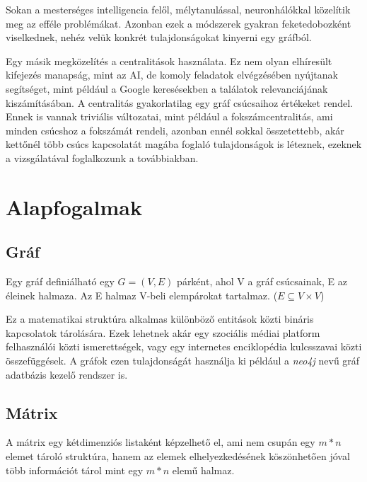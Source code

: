 \documentclass[12pt,numbers=noenddot]{report}
\begin{document}
Sokan a mesterséges intelligencia felől, mélytanulással, neuronhálókkal 
közelítik meg az efféle problémákat. Azonban ezek a módszerek gyakran 
feketedobozként viselkednek, nehéz velük konkrét tulajdonságokat kinyerni egy 
gráfból.

Egy másik megközelítés a centralitások használata. Ez nem olyan elhíresült 
kifejezés manapság, mint az AI, de komoly feladatok elvégzésében nyújtanak 
segítséget, mint például a Google keresésekben a találatok relevanciájának 
kiszámításában.
A centralitás gyakorlatilag egy gráf csúcsaihoz értékeket rendel. Ennek is 
vannak triviális változatai, mint például a fokszámcentralitás, ami minden 
csúcshoz a fokszámát rendeli, azonban ennél sokkal összetettebb, 
akár kettőnél több csúcs kapcsolatát magába foglaló tulajdonságok is léteznek, 
ezeknek a vizsgálatával foglalkozunk a továbbiakban.


\chapter{Alapfogalmak}
\pagestyle{fancy}

\section{Gráf}

Egy gráf definiálható egy $G=(V,E)$ párként, ahol V a gráf csúcsainak, E az 
éleinek halmaza. Az E halmaz V-beli elempárokat tartalmaz. 
($E \subseteq V \times V$)

Ez a matematikai struktúra alkalmas különböző entitások közti bináris kapcsolatok 
tárolására. Ezek lehetnek akár egy szociális médiai platform felhasználói közti 
ismerettségek, vagy egy internetes enciklopédia kulcsszavai közti összefüggések. 
A gráfok ezen tulajdonságát használja ki például a \textit{neo4j} nevű gráf 
adatbázis kezelő rendszer is.

\section{Mátrix}
A mátrix egy kétdimenziós listaként képzelhető el, ami nem csupán egy $m * n$ 
elemet tároló struktúra, hanem az elemek elhelyezkedésének köszönhetően jóval 
több információt tárol mint egy $m * n$ elemű halmaz.
\end{document}
